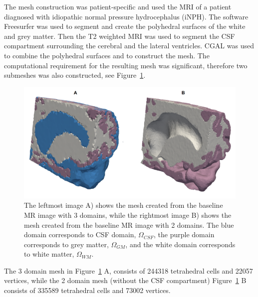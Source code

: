 \documentclass[11pt,a4paper]{article}
\newcommand{\lars}[1]{\textcolor{magenta}{#1}}
\begin{document}
The mesh construction was patient-specific and used the MRI of a patient diagnosed with idiopathic normal pressure hydrocephalus (iNPH). The software Freesurfer was used to segment and create the polyhedral surfaces of the white and grey matter. Then the T2 weighted MRI \cite{eidevalnes} was used to segment the CSF compartment surrounding the cerebral and the lateral ventricles. CGAL \cite{cgal:rty-m3-18b} was used to combine the polyhedral surfaces and to construct the mesh. The computational requirement for the resulting mesh was significant, therefore two submeshes was also constructed, see Figure~\ref{Fig::Mesh}.
\begin{figure}
\centering
\includegraphics[scale=0.2]{mesh.png} 
\caption{The leftmost image A) shows the mesh created from the baseline MR image with 3 domains, while the rightmost image  B) shows the mesh created from the baseline MR image with 2 domains. The blue domain corresponds to CSF domain, $\Omega_{CSF}$, the purple domain corresponds to grey matter,  $\Omega_{GM}$, and the white domain corresponds to white matter, $\Omega_{WM}$. }
\label{Fig::Mesh}
\end{figure}
The 3 domain mesh in Figure~\ref{Fig::Mesh} A, consists of 244318 tetrahedral cells and 22057 vertices, while the 2 domain mesh (without the CSF compartment) Figure~\ref{Fig::Mesh} B consists of 335589 tetrahedral cells and 73002 vertices. 
\end{document}
